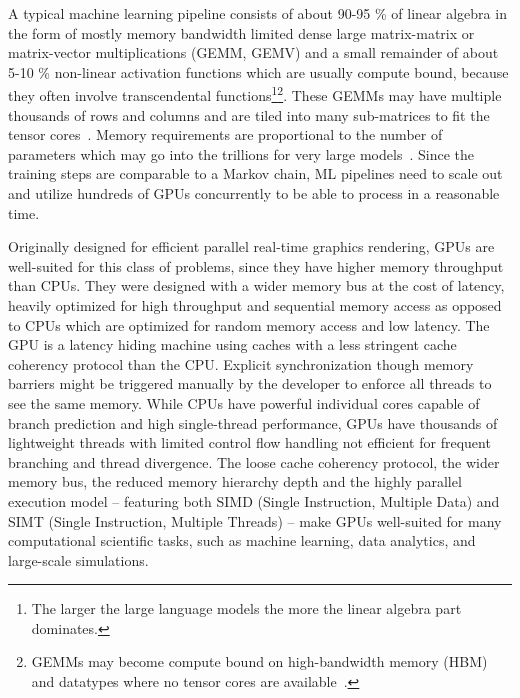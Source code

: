 A typical machine learning pipeline consists of about 90-95 \% of linear algebra in the form of mostly memory bandwidth limited dense large matrix-matrix or matrix-vector multiplications (GEMM, GEMV) and a small remainder of about 5-10 \% non-linear activation functions which are usually compute bound, because they often involve transcendental functions\footnote{The larger the large language models the more the linear algebra part dominates.}\footnote{GEMMs may become compute bound on high-bandwidth memory (HBM) and datatypes where no tensor cores are available~\cite{fusco2024}.}.
These GEMMs may have multiple thousands of rows and columns and are tiled into many sub-matrices to fit the tensor cores~\cite{novikov2015tensorizing}.
Memory requirements are proportional to the number of parameters which may go into the trillions for very large models~\cite{isaev2023}.
Since the training steps are comparable to a Markov chain, ML pipelines need to scale out and utilize hundreds of GPUs concurrently to be able to process in a reasonable time.

Originally designed for efficient parallel real-time graphics rendering, GPUs are well-suited for this class of problems, since they have higher memory throughput than CPUs.
They were designed with a wider memory bus at the cost of latency, heavily optimized for high throughput and sequential memory access as opposed to CPUs which are optimized for random memory access and low latency.
The GPU is a latency hiding machine using caches with a less stringent cache coherency protocol than the CPU.
Explicit synchronization though memory barriers might be triggered manually by the developer to enforce all threads to see the same memory.
While CPUs have powerful individual cores capable of branch prediction and high single-thread performance, GPUs have thousands of lightweight threads with limited control flow handling not efficient for frequent branching and thread divergence.
The loose cache coherency protocol, the wider memory bus, the reduced memory hierarchy depth and the highly parallel execution model -- featuring both SIMD (Single Instruction, Multiple Data) and SIMT (Single Instruction, Multiple Threads) -- make GPUs well-suited for many computational scientific tasks, such as machine learning, data analytics, and large-scale simulations.


